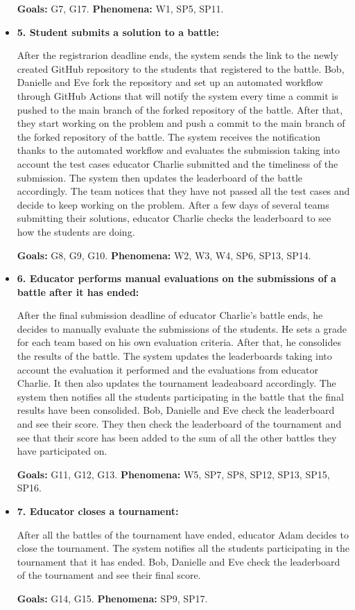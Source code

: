 \documentclass{article}
\begin{document}
\begin{itemize}
    \textbf{Goals:} G7, G17.
    \textbf{Phenomena:} W1, SP5, SP11.

    \item \textbf{5. Student submits a solution to a battle:}
    
    After the registrarion deadline ends, the system sends the link to the newly created GitHub repository to the students that registered to the battle. Bob, Danielle and Eve fork the repository and set up an automated workflow through GitHub Actions that will notify the system every time a commit is pushed to the main branch of the forked repository of the battle. After that, they start working on the problem and push a commit to the main branch of the forked repository of the battle. The system receives the notification thanks to the automated workflow and evaluates the submission taking into account the test cases educator Charlie submitted and the timeliness of the submission. The system then updates the leaderboard of the battle accordingly. The team notices that they have not passed all the test cases and decide to keep working on the problem. After a few days of several teams submitting their solutions, educator Charlie checks the leaderboard to see how the students are doing.

    \textbf{Goals:} G8, G9, G10.
    \textbf{Phenomena:} W2, W3, W4, SP6, SP13, SP14.

    \item \textbf{6. Educator performs manual evaluations on the submissions of a battle after it has ended:}
    
    After the final submission deadline of educator Charlie's battle ends, he decides to manually evaluate the submissions of the students. He sets a grade for each team based on his own evaluation criteria. After that, he consolides the results of the battle. The system updates the leaderboards taking into account the evaluation it performed and the evaluations from educator Charlie. It then also updates the tournament leadeaboard accordingly. The system then notifies all the students participating in the battle that the final results have been consolided. Bob, Danielle and Eve check the leaderboard and see their score. They then check the leaderboard of the tournament and see that their score has been added to the sum of all the other battles they have participated on.

    \textbf{Goals:} G11, G12, G13.
    \textbf{Phenomena:} W5, SP7, SP8, SP12, SP13, SP15, SP16.

    \item \textbf{7. Educator closes a tournament:}
    
    After all the battles of the tournament have ended, educator Adam decides to close the tournament. The system notifies all the students participating in the tournament that it has ended. Bob, Danielle and Eve check the leaderboard of the tournament and see their final score.

    \textbf{Goals:} G14, G15.
    \textbf{Phenomena:} SP9, SP17.


\end{itemize}
\end{document}
